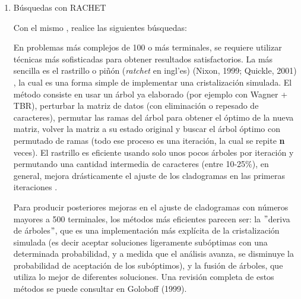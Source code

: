 \begin{itemize}
\begin{enumerate}
	\item{B\'usquedas con RACHET}

	Con el mismo , realice las siguientes b\'usquedas:

 \begin{table}[H]
 \centering
 \end{table}

En problemas m\'as complejos de 100 o m\'as terminales, se requiere utilizar t\'ecnicas m\'as sofisticadas para obtener resultados satisfactorios. La m\'as sencilla es el rastrillo o pi\~n\'on (\textit{ratchet} en ingl'es) {\color{red}(Nixon,  1999; Quickle,  2001) \cite{Nixon1999} \cite{Quicke2001}},  la cual es una forma simple de implementar una cristalizaci\'on simulada. El m\'etodo consiste en usar un \'arbol ya elaborado (por ejemplo con Wagner + TBR),  perturbar la matriz de datos (con eliminaci\'on o repesado de caracteres), permutar las ramas del \'arbol para obtener el \'optimo de la nueva matriz,  volver la matriz a su estado original y buscar el \'arbol \'optimo con permutado de ramas (todo ese proceso es una iteraci\'on,  la cual se repite \textbf{n} veces). El rastrillo es eficiente usando solo unos pocos \'arboles por iteraci\'on y permutando una cantidad intermedia de caracteres (entre 10-25\%), en general, mejora dr\'asticamente el ajuste de los cladogramas en las primeras iteraciones \cite{Nixon1999}.
 
Para producir posteriores mejoras en el ajuste de cladogramas con n\'umeros mayores a 500 terminales,  los m\'etodos m\'as eficientes parecen ser: la $"$deriva de \'arboles$"$,  que es una implementaci\'on m\'as expl\'icita de la cristalizaci\'on simulada (es decir aceptar soluciones ligeramente sub\'optimas con una determinada probabilidad,  y a medida que el an\'alisis avanza,  se disminuye la probabilidad de aceptaci\'on de los sub\'optimos), y la fusi\'on de \'arboles,  que utiliza lo mejor de diferentes soluciones. Una revisi\'on completa de estos m\'etodos se puede consultar en {\color{red} Goloboff (1999)\cite{Goloboff1999}}.
  

\end{enumerate}
\end{itemize}
